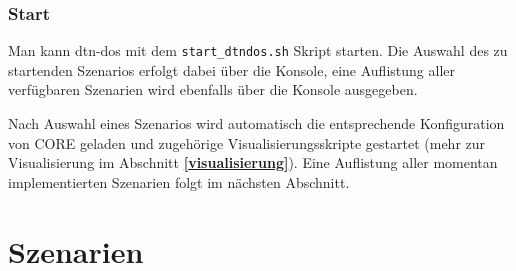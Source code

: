 \documentclass{article}
\begin{document}
\subsubsection{Start}
Man kann dtn-dos mit dem \texttt{start\_dtndos.sh} Skript starten. Die Auswahl des zu startenden Szenarios erfolgt dabei über die Konsole, eine Auflistung aller verfügbaren Szenarien wird ebenfalls über die Konsole ausgegeben.\par
Nach Auswahl eines Szenarios wird automatisch die entsprechende Konfiguration von CORE geladen und zugehörige Visualisierungsskripte gestartet (mehr zur Visualisierung im Abschnitt \textbf{\ref{visualisierung}}). Eine Auflistung aller momentan implementierten Szenarien folgt im nächsten Abschnitt.
\section{Szenarien}
\end{document}
